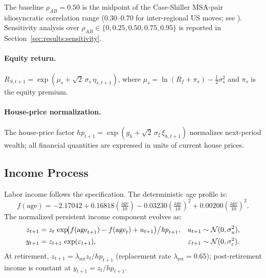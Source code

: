 The baseline $\rho_{AB} = 0.50$ is the midpoint of the Case-Shiller MSA-pair
idiosyncratic correlation range ($0.30$--$0.70$ for inter-regional US moves;
see \citealt{calibrationV3}).  Sensitivity analysis over
$\rho_{AB} \in \{0, 0.25, 0.50, 0.75, 0.95\}$ is reported in
Section~\ref{sec:results:sensitivity}.

\paragraph{Equity return.}
$R_{S,t+1} = \exp(\mu_s + \sqrt{2}\,\sigma_s\,\eta_{s,t+1})$,
where $\mu_s = \ln(R_f + \pi_s) - \frac{1}{2}\sigma_s^2$ and $\pi_s$
is the equity premium.

\paragraph{House-price normalization.}
The house-price factor $\mathit{hp}_{t+1} = \exp(g_h + \sqrt{2}\,\sigma_\xi\,\xi_{h,t+1})$
normalizes next-period wealth; all financial quantities are expressed in
units of current house prices.

\subsection{Income Process}
\label{sec:model:income}

Labor income follows the \citet{CoccoGomesMaenhout2005} specification.
The deterministic age profile is:
\begin{equation}
    f(\text{age}) = -2.17042 + 0.16818\left(\tfrac{\text{age}}{10}\right)
                   - 0.03230\left(\tfrac{\text{age}}{10}\right)^{\!2}
                   + 0.00200\left(\tfrac{\text{age}}{10}\right)^{\!3}.
    \label{eq:income_profile}
\end{equation}
The normalized persistent income component evolves as:
\begin{align}
    z_{t+1} &= z_t\,\exp\!\bigl(f(\text{age}_{t+1}) - f(\text{age}_t)
               + u_{t+1}\bigr)\big/\mathit{hp}_{t+1},
               & u_{t+1} &\sim \mathcal{N}(0, \sigma_u^2), \notag \\
    y_{t+1} &= z_{t+1}\,\exp(\varepsilon_{t+1}),
               & \varepsilon_{t+1} &\sim \mathcal{N}(0, \sigma_\varepsilon^2).
               \label{eq:income}
\end{align}
At retirement, $z_{t+1} = \lambda_{\text{ret}} z_t / \mathit{hp}_{t+1}$
(replacement rate $\lambda_{\text{ret}} = 0.65$); post-retirement income
is constant at $y_{t+1} = z_t / \mathit{hp}_{t+1}$.

